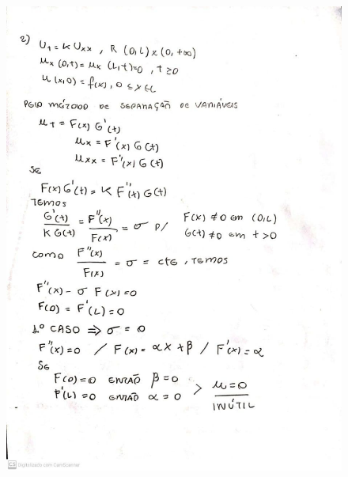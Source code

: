 \documentclass[a4paper]{article}
\begin{document}
    \section{}

        \begin{figure}{\textwidth}
            \centering
            \includegraphics[width=\textwidth]{21.jpg}
        \end{figure}
\end{document}
